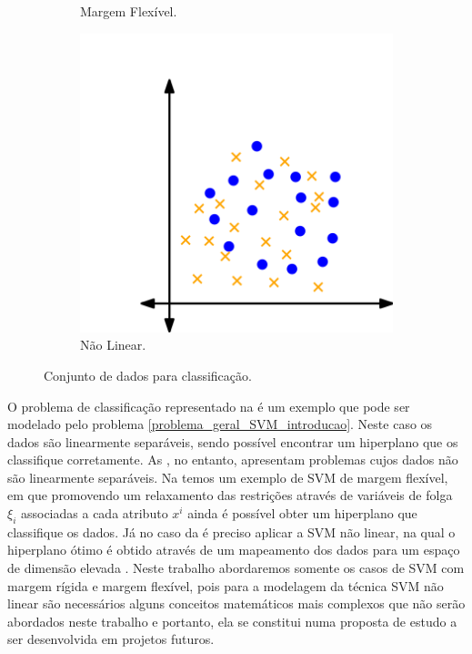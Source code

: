\documentclass[12pt,a4paper]{scrartcl}
\theoremstyle{definition}%
\begin{document}
\begin{figure}[!ht]
\begin{subfigure}[!ht]{0.3\textwidth}
	\caption{Margem Flexível. \label{fig:hiperplano_margemflexivel}}
\end{subfigure}
\begin{subfigure}[!ht]{0.3\textwidth}
	\centering
	\includegraphics[width=\textwidth]{hiperplano_SVM_nao_linear}
	\caption{Não Linear. \label{fig:SVM_naolinear}}
\end{subfigure}
\caption{Conjunto de dados para classificação. \label{fig:distribuicao_dados_e_classificacao}}
\end{figure}

O problema de classificação representado na  é um exemplo que pode ser modelado pelo problema \eqref{problema_geral_SVM_introducao}. Neste caso os dados são linearmente separáveis, sendo possível encontrar um hiperplano que os classifique corretamente. As , no entanto, apresentam problemas cujos dados não são linearmente separáveis. Na  temos um exemplo de SVM de margem flexível, em que promovendo um relaxamento das restrições através de variáveis de folga $\xi_{i}$ associadas a cada atributo $x^{i}$ ainda é possível obter um hiperplano que classifique os dados. Já no caso da  é preciso aplicar a SVM não linear, na qual o hiperplano ótimo é obtido através de um mapeamento dos dados para um espaço de dimensão elevada \cite{Evelin2017}. Neste trabalho abordaremos somente os casos de SVM com margem rígida e margem flexível, pois para a modelagem da técnica SVM não linear são necessários alguns conceitos matemáticos mais complexos que não serão abordados neste trabalho e portanto, ela se constitui numa proposta de estudo a ser desenvolvida em projetos futuros.
\end{document}
